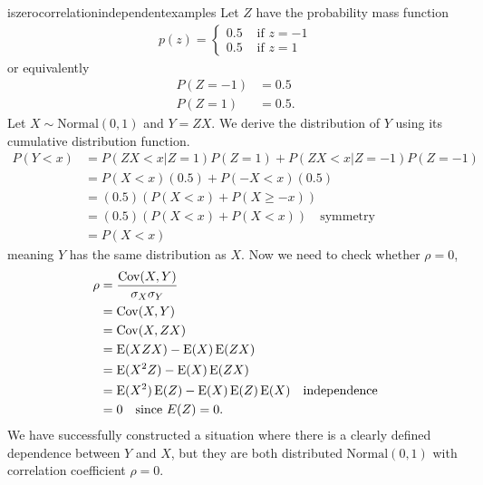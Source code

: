 \begin{answer}{iszerocorrelationindependentexamples}
Let $Z$ have the probability mass function
\begin{align*}
p(z) =
\begin{cases}
  0.5 & \text{ if } z = -1 \\
  0.5 & \text{ if } z = 1
\end{cases}
\end{align*}
or equivalently
\begin{align*}
P(Z = -1) &= 0.5  \\
P(Z =  1) &= 0.5
\text{.}
\end{align*}
Let $X \sim \text{Normal}(0,1)$
and
$Y = ZX$.
We derive the distribution of $Y$ using its cumulative distribution function.
\begin{align*}
P(Y<x) &=
P( ZX<x| Z = 1)P(Z=1) +
P( ZX<x| Z = -1)P(Z=-1) \\
&=
P( X<x)(0.5) + P(-X<x)(0.5) \\
&=  (0.5)( P( X<x) + P(X \geq -x)) \\
&=  (0.5)( P( X<x) + P(X < x)) \quad \text{symmetry} \\
&=   P(X < x)
\end{align*}
meaning $Y$ has the same distribution as $X$.
Now we need to check whether $\rho=0$,
\begin{align*}
\rho
&= \frac{\operatorname{\mathrm{Cov}}(X,Y)}{\sigma_X \sigma_Y}  \\
&= \operatorname{\mathrm{Cov}}(X,Y) \\
&= \operatorname{\mathrm{Cov}}(X, ZX) \\
&= \operatorname{\mathrm{E}}(XZX) - \operatorname{\mathrm{E}}(X) \operatorname{\mathrm{E}}(ZX)  \\
&= \operatorname{\mathrm{E}}(X^2 Z) - \operatorname{\mathrm{E}}(X) \operatorname{\mathrm{E}}(ZX)  \\
&= \operatorname{\mathrm{E}}(X^2) \operatorname{\mathrm{E}}(Z) - \operatorname{\mathrm{E}}(X)\operatorname{\mathrm{E}}(Z)\operatorname{\mathrm{E}}(X)   \quad \text{independence} \\
&=  0                                \quad \text{since } E(Z)=0
\text{.}
\end{align*}
We have successfully constructed a situation where
there is a clearly defined dependence between $Y$ and $X$, but
they are both distributed $\text{Normal}(0,1)$ with correlation coefficient
$\rho = 0$.
\end{answer}

